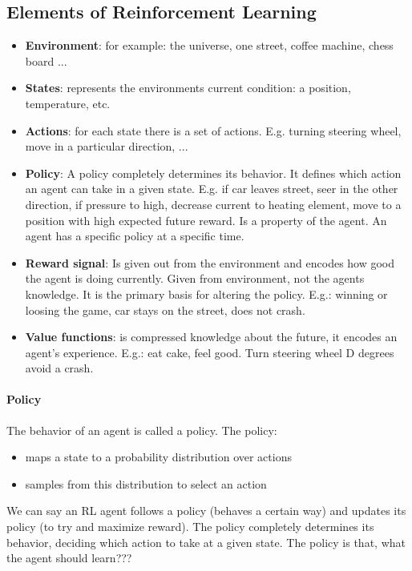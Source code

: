 \documentclass[10pt,a4paper]{article}
\begin{document}
\subsection{Elements of Reinforcement Learning}
\begin{itemize}
\item \textbf{Environment}: for example: the universe, one street, coffee machine, chess board ...
\item \textbf{States}: represents the environments current condition: a position, temperature, etc.
\item \textbf{Actions}: for each state there is a set of actions. E.g. turning steering wheel, move in a particular direction, ...
\item \textbf{Policy}: A policy completely determines its behavior. It defines which action an agent can take in a given state. E.g. if car leaves street, seer in the other direction, if pressure to high, decrease current to heating element, move to a position with high expected future reward. Is a property of the agent. An agent has a specific policy at a specific time.
\item \textbf{Reward signal}: Is given out from the environment and encodes how good the agent is doing currently. Given from environment, not the agents knowledge. It is the primary basis for altering the policy. E.g.: winning or loosing the game, car stays on the street, does not crash. 
\item \textbf{Value functions}: is compressed knowledge about the future, it encodes an agent's experience. E.g.: eat cake, feel good. Turn steering wheel D degrees avoid a crash.
\end{itemize}

\paragraph{Policy}
The behavior of an agent is called a policy. The policy:
\begin{itemize}
\item maps a state to a probability distribution over actions
\item samples from this distribution to select an action
\end{itemize}
We can say an RL agent follows a policy (behaves a certain way) and updates its policy (to try and maximize reward).
The policy completely determines its behavior, deciding which action to take at a given state.
The policy is that, what the agent should learn???
\end{document}
